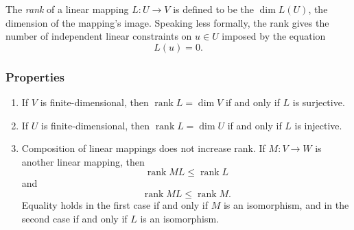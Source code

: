 \documentclass[12pt]{article}
\newcommand{\rank}{\operatorname{rank}}
\begin{document}
The \emph{rank} of a linear mapping $L\colon U\to V$ is defined to be
the $\dim L(U)$, the dimension of the mapping's image.  Speaking less
formally, the rank gives the number of independent linear constraints
on $u\in U$ imposed by the equation
\[ L(u)=0. \]

\subsubsection*{Properties}
\begin{enumerate}
\item If $V$ is finite-dimensional, then $\rank L=\dim V$ if and only
  if $L$ is surjective.
\item If $U$ is finite-dimensional, then $\rank L=\dim U$ if and only
  if $L$ is injective.
\item Composition of linear mappings does not increase rank.  If
  $M\colon V\to W$ is another linear mapping, then \[\rank ML \le
  \rank L\] and
  \[\rank ML \le \rank M.\] Equality holds in the first case if
  and only if $M$ is an isomorphism, and in the second case if and
  only if $L$ is an isomorphism.
\end{enumerate}
\end{document}
